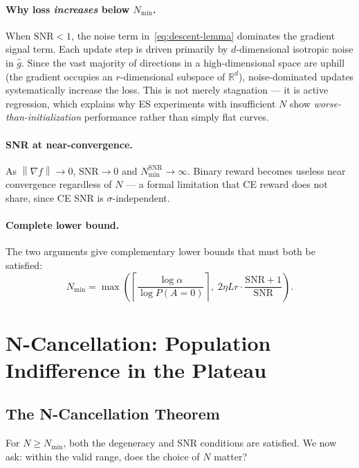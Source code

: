 \documentclass[11pt]{article}
\theoremstyle{definition}
\theoremstyle{remark}
\newcommand{\R}{\mathbb{R}}
\newcommand{\norm}[1]{\left\|#1\right\|}
\newcommand{\Nmin}{N_{\mathrm{min}}}
\newcommand{\SNR}{\mathrm{SNR}}
\begin{document}
\paragraph{Why loss \emph{increases} below $\Nmin$.}
When $\SNR < 1$, the noise term in~\eqref{eq:descent-lemma} dominates the gradient signal term. Each update step is driven primarily by $d$-dimensional isotropic noise in $\hat{g}$. Since the vast majority of directions in a high-dimensional space are uphill (the gradient occupies an $r$-dimensional subspace of $\R^d$), noise-dominated updates systematically increase the loss. This is not merely stagnation --- it is active regression, which explains why ES experiments with insufficient $N$ show \emph{worse-than-initialization} performance rather than simply flat curves.

\paragraph{SNR at near-convergence.}
As $\norm{\nabla f} \to 0$, $\SNR \to 0$ and $\Nmin^{\mathrm{SNR}} \to \infty$. Binary reward becomes useless near convergence regardless of $N$ --- a formal limitation that CE reward does not share, since CE SNR is $\sigma$-independent.

\paragraph{Complete lower bound.}
The two arguments give complementary lower bounds that must both be satisfied:
\begin{equation}
  \Nmin = \max\!\left(\left\lceil\frac{\log\alpha}{\log P(A=0)}\right\rceil,\; 2\eta Lr\cdot\frac{\SNR+1}{\SNR}\right).
  \label{eq:nmin-complete}
\end{equation}

\section{N-Cancellation: Population Indifference in the Plateau}
\label{sec:cancellation}

\subsection{The N-Cancellation Theorem}

For $N \geq \Nmin$, both the degeneracy and SNR conditions are satisfied. We now ask: within the valid range, does the choice of $N$ matter?
\end{document}
